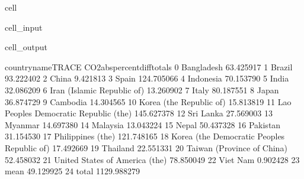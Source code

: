 \documentclass[letterpaper,10pt,english]{jupyterBook}
\begin{document}
\begin{sphinxuseclass}{cell}
\begin{sphinxVerbatimInput}
\begin{sphinxuseclass}{cell_input}
\end{sphinxuseclass}\end{sphinxVerbatimInput}
\begin{sphinxVerbatimOutput}

\begin{sphinxuseclass}{cell_output}
\begin{sphinxVerbatim}[commandchars=\\\{\}]
                             country\PYGZus{}name\PYGZus{}TRACE  CO2\PYGZus{}abs\PYGZus{}percent\PYGZus{}diff\PYGZus{}totals  \PYGZbs{}
0                                    Bangladesh                    63.425917   
1                                        Brazil                    93.222402   
2                                         China                     9.421813   
3                                         Spain                   124.705066   
4                                     Indonesia                    70.153790   
5                                         India                    32.086209   
6                    Iran (Islamic Republic of)                    13.260902   
7                                         Italy                    80.187551   
8                                         Japan                    36.874729   
9                                      Cambodia                    14.304565   
10                      Korea (the Republic of)                    15.813819   
11       Lao People\PYGZsq{}s Democratic Republic (the)                   145.627378   
12                                    Sri Lanka                    27.569003   
13                                      Myanmar                    14.697380   
14                                     Malaysia                    13.043224   
15                                        Nepal                    50.437328   
16                                     Pakistan                    31.154530   
17                            Philippines (the)                   121.748165   
18  Korea (the Democratic People\PYGZsq{}s Republic of)                    17.492669   
19                                     Thailand                    22.551331   
20                   Taiwan (Province of China)                    52.458032   
21               United States of America (the)                    78.850049   
22                                     Viet Nam                     0.902428   
23                                         mean                    49.129925   
24                                        total                  1129.988279   


\end{sphinxVerbatim}
\end{sphinxuseclass}
\end{sphinxVerbatimOutput}
\end{sphinxuseclass}
\end{document}
